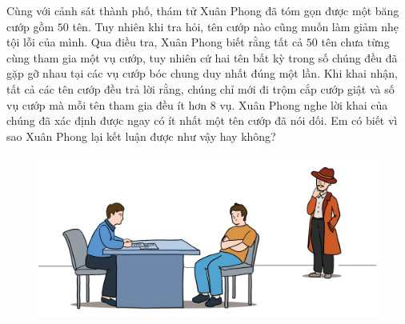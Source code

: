 \begin{multicols}{2}
	Cùng với cảnh sát thành phố, thám tử Xuân Phong đã tóm gọn được một băng cướp gồm $50$ tên. Tuy nhiên khi tra hỏi, tên cướp nào cũng muốn làm giảm nhẹ tội lỗi của mình. Qua điều tra, Xuân Phong biết rằng tất cả $50$ tên chưa từng cùng tham gia một vụ cướp, tuy nhiên cứ hai tên bất kỳ trong số chúng đều đã gặp gỡ nhau tại các vụ cướp bóc chung duy nhất đúng một lần. Khi khai nhận, tất cả các tên cướp đều trả lời rằng, chúng chỉ mới đi trộm cắp cướp giật và số vụ cướp mà mỗi tên tham gia đều ít hơn $8$ vụ. Xuân Phong nghe lời khai của chúng đã xác định được ngay có ít nhất một tên cướp đã nói dối. Em có biết vì sao Xuân Phong lại kết luận được như vậy hay không?
\end{multicols}
\begin{figure}[H]
	\centering
	\vspace*{-5pt}
	\captionsetup{labelformat= empty, justification=centering}
	\includegraphics[width=1\linewidth]{xp}
	\vspace*{-5pt}
\end{figure}
